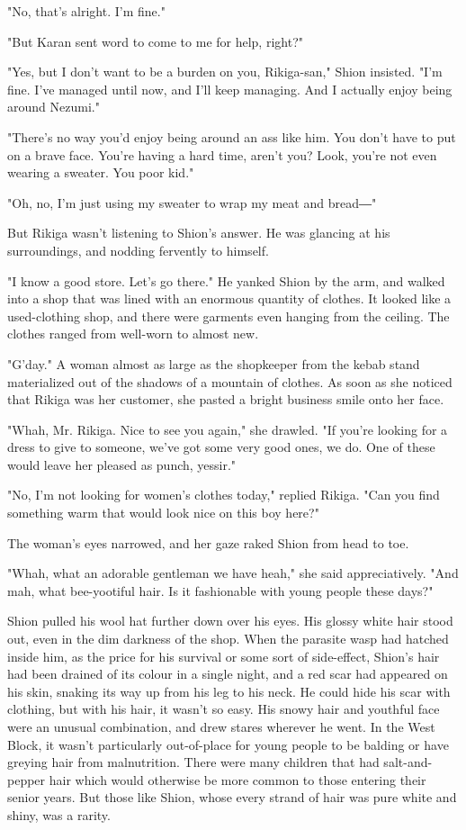 "No, that's alright. I'm fine."

"But Karan sent word to come to me for help, right?"

"Yes, but I don't want to be a burden on you, Rikiga-san," Shion
insisted. "I'm fine. I've managed until now, and I'll keep managing. And
I actually enjoy being around Nezumi."

"There's no way you'd enjoy being around an ass like him. You don't have
to put on a brave face. You're having a hard time, aren't you? Look,
you're not even wearing a sweater. You poor kid."

"Oh, no, I'm just using my sweater to wrap my meat and bread―"

But Rikiga wasn't listening to Shion's answer. He was glancing at his
surroundings, and nodding fervently to himself.

"I know a good store. Let's go there." He yanked Shion by the arm, and
walked into a shop that was lined with an enormous quantity of clothes.
It looked like a used-clothing shop, and there were garments even
hanging from the ceiling. The clothes ranged from well-worn to almost
new.

"G'day." A woman almost as large as the shopkeeper from the kebab stand
materialized out of the shadows of a mountain of clothes. As soon as she
noticed that Rikiga was her customer, she pasted a bright business smile
onto her face.

"Whah, Mr. Rikiga. Nice to see you again," she drawled. "If you're
looking for a dress to give to someone, we've got some very good ones,
we do. One of these would leave her pleased as punch, yessir."

"No, I'm not looking for women's clothes today," replied Rikiga. "Can
you find something warm that would look nice on this boy here?"

The woman's eyes narrowed, and her gaze raked Shion from head to toe.

"Whah, what an adorable gentleman we have heah," she said
appreciatively. "And mah, what bee-yootiful hair. Is it fashionable with
young people these days?"

Shion pulled his wool hat further down over his eyes. His glossy white
hair stood out, even in the dim darkness of the shop. When the parasite
wasp had hatched inside him, as the price for his survival or some sort
of side-effect, Shion's hair had been drained of its colour in a single
night, and a red scar had appeared on his skin, snaking its way up from
his leg to his neck. He could hide his scar with clothing, but with his
hair, it wasn't so easy. His snowy hair and youthful face were an
unusual combination, and drew stares wherever he went. In the West
Block, it wasn't particularly out-of-place for young people to be
balding or have greying hair from malnutrition. There were many children
that had salt-and-pepper hair which would otherwise be more common to
those entering their senior years. But those like Shion, whose every
strand of hair was pure white and shiny, was a rarity.

